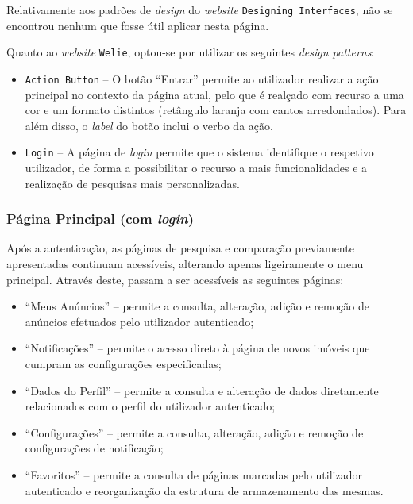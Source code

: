Relativamente aos padrões de \textit{design} do \textit{website} \texttt{Designing Interfaces}, não se encontrou nenhum que fosse útil aplicar nesta página.

Quanto ao \textit{website} \texttt{Welie}, optou-se por utilizar os seguintes \textit{design patterns}:

\begin{itemize}
    \item \texttt{Action Button} -- O botão ``Entrar'' permite ao utilizador realizar a ação principal no contexto da página atual, pelo que é realçado com recurso a uma cor e um formato distintos (retângulo laranja com cantos arredondados). Para além disso, o \textit{label} do botão inclui o verbo da ação.

    \item \texttt{Login} -- A página de \textit{login} permite que o sistema identifique o respetivo utilizador, de forma a possibilitar o recurso a mais funcionalidades e a realização de pesquisas mais personalizadas.
\end{itemize}


\subsubsection{Página Principal (com \textit{login})}

Após a autenticação, as páginas de pesquisa e comparação previamente apresentadas continuam acessíveis, alterando apenas ligeiramente o menu principal. Através deste, passam a ser acessíveis as seguintes páginas:
\begin{itemize}
    \item ``Meus Anúncios'' -- permite a consulta, alteração, adição e remoção de anúncios efetuados pelo utilizador autenticado;
    \item ``Notificações'' --  permite o acesso direto à página de novos imóveis que cumpram as configurações especificadas;
    \item ``Dados do Perfil'' -- permite a consulta e alteração de dados diretamente relacionados com o perfil do utilizador autenticado;
    \item ``Configurações'' -- permite a consulta, alteração, adição e remoção de configurações de notificação;
    \item ``Favoritos'' -- permite a consulta de páginas marcadas pelo utilizador autenticado e reorganização da estrutura de armazenamento das mesmas.
\end{itemize}

